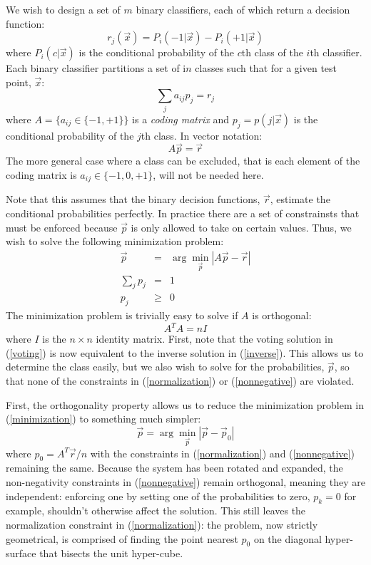 \documentclass{article}
\begin{document}
We wish to design a set of $m$ binary classifiers, each of which return a 
decision function:
\begin{equation}
r_j(\vec x) = P_i(-1 | \vec x) - P_i(+1 | \vec x)
\end{equation}
where $P_i(c | \vec x)$ is the conditional probability of the $c$th class of
the $i$th classifier.
Each binary classifier partitions a set of i$n$ classes such that for a
given test point, $\vec x$:
\begin{equation}
\sum_j a_{ij} p_j = r_j
\end{equation}
where $A=\lbrace a_{ij} \in \lbrace -1, +1 \rbrace  \rbrace$ is a {\it coding
matrix} and $p_j = p(j | \vec x)$ is the conditional probability of the $j$th
class.
In vector notation:
\begin{equation}
	A \vec p = \vec r \label{inverse}
\end{equation}
The more general case where a class can be excluded, that is each element of 
the coding matrix is $a_{ij} \in \lbrace -1, 0, +1\rbrace$, 
will not be needed here.

Note that this assumes that the binary decision functions, $\vec r$,
estimate the conditional probabilities perfectly.
In practice
there are a set of constrainsts that must be enforced
because $\vec p$ is only allowed to take on certain values.
Thus, we wish to solve the following minimization problem:
\begin{eqnarray}
	\vec p & = & \arg \min_{\vec p} | A \vec p - \vec r | \label{minimization}\\
	\sum_j p_j & = & 1 \label{normalization}\\
	p_j & \ge & 0 \label{nonnegative}
\end{eqnarray}
The minimization problem is trivially easy to solve if $A$ is orthogonal:
\begin{equation}
	A^T A = n I
\end{equation}
where $I$ is the $n \times n$ identity matrix.
First, note that the voting solution in (\ref{voting}) is now equivalent to
the inverse solution in (\ref{inverse}).
This allows us to determine the class easily, but we also wish to solve for
the probabilities, $\vec p$, so that none of the constraints in 
(\ref{normalization}) or (\ref{nonnegative}) are violated.

First, the orthogonality property allows us to reduce the minimization problem 
in (\ref{minimization}) to something much simpler:
\begin{equation}
	\vec p = \arg \min_{\vec p} | \vec p - \vec p_0 |
\end{equation}
where $p_0 = A^T \vec r/n$ with the constraints in (\ref{normalization}) and
(\ref{nonnegative}) remaining the same.
Because the system has been rotated and expanded, the non-negativity 
constraints in (\ref{nonnegative}) remain orthogonal, meaning they are 
independent: enforcing one by setting one of the probabilities to zero, 
$p_k=0$ for example, shouldn't otherwise affect the solution.
This still leaves the normalization constraint in (\ref{normalization}):
the problem, now strictly geometrical, is comprised of finding the point nearest $p_0$ on the diagonal hyper-surface that bisects the unit hyper-cube.
\end{document}
